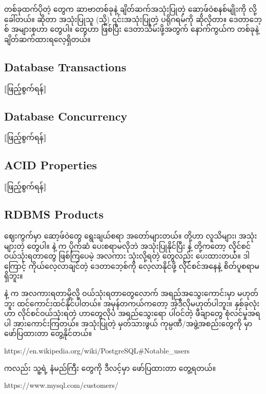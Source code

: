 တစ်ခုထက်ပိုတဲ့  တွေက ဆာဗာတစ်ခုနဲ့ ချိတ်ဆက်အသုံးပြုတဲ့ ဆော့ဖ်ဝဲစနစ်မျိုးကို   လို့ ခေါ်တယ်။  ဆိုတာ အသုံးပြုသူ  (သို့) ၎င်းအသုံးပြုတဲ့ ပရိုဂရမ်ကို ဆိုလိုတာ။ ဒေတာဘေ့စ်  အများစုဟာ  တွေပါ။  တွေဟာ  ဖြစ်ပြီး ဒေတာသိမ်းဖို့အတွက် နောက်ကွယ်က  တစ်ခုနဲ့ ချိတ်ဆက်ထားရလေ့ရှိတယ်။ 

\subsection*{Database Transactions}
$\big\llbracket$ဖြည့်စွက်ရန်$\big\rrbracket$

\subsection*{Database Concurrency}
$\big\llbracket$ဖြည့်စွက်ရန်$\big\rrbracket$

\subsection*{ACID Properties}
$\big\llbracket$ဖြည့်စွက်ရန်$\big\rrbracket$

\subsection*{RDBMS Products}
ဈေးကွက်မှာ  ဆော့ဖ်ဝဲတွေ ရွေးချယ်စရာ အတော်များတယ်။  တို့ဟာ လူသိများ၊ အသုံးများတဲ့  တွေပါ။  နဲ့  က ပိုက်ဆံ ပေးစရာမလိုဘဲ အသုံးပြုနိုင်ပြီး  နဲ့  တို့ကတော့ လိုင်စင်ဝယ်သုံးရတာတွေ ဖြစ်ကြပေမဲ့ အလကား သုံးလို့ရတဲ့  တွေလည်း ပေးထားတယ်။ ဒါကြောင့် ကိုယ်လေ့လာချင်တဲ့ ဒေတာဘေ့စ်ကို လေ့လာနိုင်ဖို့ လိုင်စင်အနေနဲ့ စိတ်ပူစရာမရှိဘူး။ 

 နဲ့  က အလကားရတာမို့လို့ ဝယ်သုံးရတာတွေလောက် အရည်အသွေးကောင်းမှာ မဟုတ်ဘူး ထင်ကောင်းထင်နိုင်ပါတယ်။ အမှန်တကယ်ကတော့ အဲ့ဒီလိုမဟုတ်ပါဘူး။ နှစ်ခုလုံးဟာ လိုင်စင်ဝယ်သုံးရတဲ့ ဟာတွေလိုပဲ အရည်သွေးရော ပါဝင်တဲ့ ဖီချာတွေ စုံလင်မှုအရပါ အားကောင်းကြတယ်။  အသုံးပြုတဲ့ မှတ်သားဖွယ် ကုမ္ပဏီ/အဖွဲ့အစည်းတွေကို  မှာ ဖော်ပြထားတာ တွေ့နိုင်တယ်။
%
\begin{vbtm}
https://en.wikipedia.org/wiki/PostgreSQL#Notable_users
\end{vbtm}
% 
 ကလည်း သူ့ရဲ့ နံမည်ကြီး  တွေ‌ကို ဒီလင့်မှာ ဖော်ပြထားတာ တွေ့ရတယ်။ 
\begin{vbtm}
https://www.mysql.com/customers/
\end{vbtm}
% 

